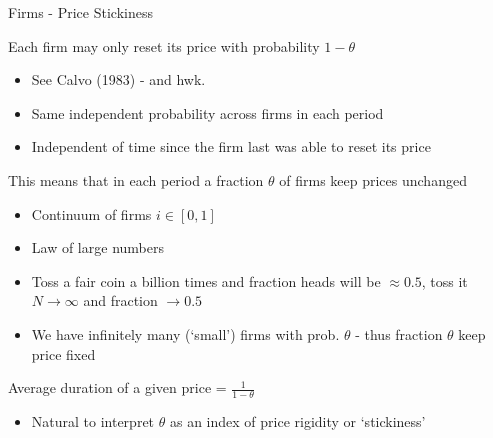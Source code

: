 \documentclass{beamer}
\begin{document}

	
\begin{frame}{Firms - Price Stickiness}

Each firm may only reset its price with probability $1-\theta$
\begin{itemize}
\item	See Calvo (1983) - and hwk.
\item	Same independent probability across firms in each period
\item	Independent of time since the firm last was able to reset its price
\end{itemize}

\vspace{2mm}
This means that in each period a fraction $\theta$ of firms keep prices unchanged
\begin{itemize}
\item	Continuum of firms $i \in [0,1]$
\item	Law of large numbers
\item	Toss a fair coin a billion times and fraction heads will be $\approx 0.5$, toss it $N\rightarrow\infty$ and fraction $\rightarrow 0.5$
\item	We have infinitely many (`small') firms with prob. $\theta$ - thus fraction $\theta$ keep price fixed
\end{itemize}

\vspace{2mm}
Average duration of a given price = $\frac{1}{1-\theta}$
\begin{itemize}
\item	Natural to interpret $\theta$ as an index of price rigidity or `stickiness'
\end{itemize}

\end{frame}


	
\end{document}
